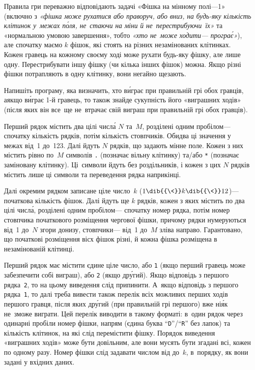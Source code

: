 
Правила гри переважно відповідають задачі\nolinebreak[3] 
«Фішка на мінному полі—1» (включно з \textsl{«фішка може рухатися або праворуч, або вниз, на будь-яку кількість клітинок у~межах \mbox{п\'{о}ля}, не~стаючи на міни й не~перестрибуючи~їх»} та «нормальною умовою завершення», тобто \textsl{«хто не~може ходити\nolinebreak[3] — програ\'{є}»}), але спочатку маємо $k$ фішок, які стоять на різних неза\-мі\-но\-ва\-них клітинках. Кожен гравець на кожному своєму ході може рухати будь-яку фішку, але лише одну. Перестрибувати іншу фішку (чи кілька інших фішок) можна. Якщо різні фішки потрапляють в одну клітинку, вони нега\-йно щезають.

Напишіть програму, яка визначить, хто в\'{и}грає при правильній грі обох гравців, а\nolinebreak[3] якщо в\'{и}грає \mbox{1-й} гравець, то також знайде сукупність його «виграшних ходів» (після яких він все~ще не~втрачає свій виграш при правильній грі обох гравців).

\InputFile
Перший рядок містить два цілі числ\'{а} $N$ та~$M$, розділені одним пробілом\nolinebreak[3] — спочатку кількість рядків, потім кількість стовпчиків. Обидва ці значення у межах від~1 до~123.
Далі йдуть $N$ рядків, що задають мінне поле. Кожен з них містить рівно по~$M$ символів \texttt{.} (позначає вільну клітинку) та/або \texttt{*} (позначає заміновану клітинку). Ці~символи йдуть без роздільників, і кожен з цих $N$ рядків містить лише ці символи та переведення рядка наприкінці.

Далі окремим рядком записане ціле число~$k$ ($1\dib{{\<}}k\dib{{\<}}12$)\nolinebreak[3] — початкова кількість фішок. Далі йдуть ще $k$ рядків, кожен з яких містить по два цілі числ\'{а}, розділені одним пробілом\nolinebreak[3] — спочатку номер рядка, потім номер стовпчика початкового розміщення чергової фішки, причому рядки нумеруються від~1 до~$N$ згори донизу, стовпчики\nolinebreak[3] — від~1 до~$M$ зліва направо. Гарантовано, що початкові розміщення вісх фішок різні, й кожна фішка розміщена в неза\-мі\-но\-ва\-ній клітинці.

\OutputFile
Перший рядок має містити єдине ціле число, або \texttt{1} (якщо перший гравець може забезпечити собі виграш), або \texttt{2} (якщо др\'{у}гий). Якщо відповідь з першого рядка~\texttt{2}, то на цьому виведення слід припинити. А~якщо відповідь з першого рядка~\texttt{1}, то далі треба вивести також перелік всіх можливих перших ходів першого гравця, після яких др\'{у}гий (при правильній грі першого) вже ні\'{я}к не~зможе виграти. Цей перелік виводити в такому форматі: в~один рядок через одинарні пробіли номер фішки, напрям (єдина буква ``\texttt{D}''/``\texttt{R}'' без лапок) та кількість клітинок, на які слід перемістити фішку. 
Порядок виведення «виграшних ходів» може бути довільним, але вони мусять бути згадані всі, кожен по одному разу.
Номер фішки слід задавати числом від до~$k$, в~порядку, як вони задані у вхідних даних.


